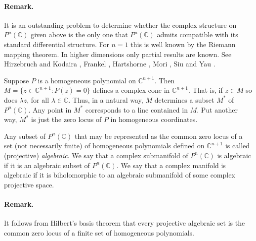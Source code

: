 \paragraph*{Remark.} It is an outstanding problem to determine whether the complex structure on $P^n(\mathbb C)$ given above is the only one that $P^n(\mathbb C)$ admits compatible with its standard differential structure. For $n=1$ this is well known by the Riemann mapping theorem. In higher dimensions only partial results are known. See Hirzebruch and Kodaira \cite{bib:I:hirzebruch-f-and-kodaira-k:1}, Frankel \cite{bib:I:frankel-t:1}, Hartshorne \cite{bib:I:hartshorne-r:1}, Mori \cite{bib:I:mori-s:1}, Siu and Yau \cite{bib:I:siu-y-t-and-yau-s-t:1}.

Suppose $P$ is a homogeneous polynomial on $\mathbb C^{n+1}$. Then $M=\{z\in\mathbb C^{n+1}:P(z)=0\}$ defines a complex cone in $\mathbb C^{n+1}$. That is, if $z\in M$ so does $\lambda z$, for all $\lambda\in\mathbb C$. Thus, in a natural way, $M$ determines a subset $M^*$ of $P^n(\mathbb C)$. Any point in $M^*$ corresponds to a line contained in $M$. Put another way, $M^*$ is just the zero locus of $P$ in homogeneous coordinates.

 Any subset of $P^n(\mathbb C)$ that may be represented as the common zero locus of a set (not necessarily finite) of homogeneous polynomials defined on $\mathbb C^{n+1}$ is called (projective) \emph{algebraic}.
We say that a complex submanifold of $P^n(\mathbb C)$ is algebraic if it is an algebraic subset of $P^n(\mathbb C)$. We say that a complex manifold is algebraic if it is biholomorphic to an algebraic submanifold of some complex projective space.

\paragraph*{Remark.} It follows from Hilbert's basis theorem that every projective algebraic set is the common zero locus of a finite set of homogeneous polynomials.

